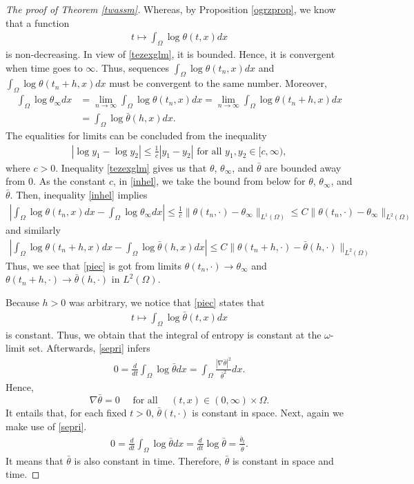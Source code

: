 \documentclass[11pt]{article}
\numberwithin{equation}{section}
\theoremstyle{plain}
\newcommand{\tn}{\Omega}
\newcommand{\io}{\int_{\Omega}}
\newcommand{\ld}{L^2(\Omega)}
\newcommand{\ddt}{\frac{d}{dt}}
\newcommand{\ot}{(0,\infty)\times\Omega}
\begin{document}
\begin{proof}[The proof of Theorem \ref{twassm}]
Whereas, by Proposition \ref{ogrzprop}, we know that a function
\begin{align*}
t\mapsto\io\log\theta(t,x)dx
\end{align*}
is non-decreasing. In view of \eqref{tezexglm}, it is bounded. Hence, it is convergent when time goes to $\infty$. Thus, sequences $\io\log\theta(t_n,x)dx$ and $\io\log\theta(t_n+h,x)dx$ must be convergent to the same number. Moreover,
\begin{align}\label{piec}
\nonumber\io\log\theta_{\infty} dx&=\lim_{n\to\infty}\io\log\theta(t_n,x)dx=\lim_{n\to\infty}\io\log\theta(t_n+h,x)dx\\
&=\io\log\bar\theta(h,x)dx.
\end{align}
The equalities for limits can be concluded from the inequality
\begin{align}\label{inhel}
|\log y_1-\log y_2|\leq\frac1c|y_1-y_2| \text{ for all }y_1,y_2\in[c,\infty),
\end{align}
where $c>0$. Inequality \eqref{tezexglm} gives us that $\theta$, $\theta_{\infty}$, and $\bar\theta$ are bounded away from $0$. As the constant $c$, in \eqref{inhel}, we take the bound from below for $\theta$, $\theta_{\infty}$, and $\bar\theta$.  Then, inequality \eqref{inhel} implies
\begin{align*}
\left|\io\log\theta(t_n,x)dx-\io\log\theta_{\infty} dx\right|\leq \frac1c\|\theta(t_n,\cdot)-\theta_{\infty}\|_{L^1(\tn)}\leq C\|\theta(t_n,\cdot)-\theta_{\infty}\|_{\ld}
\end{align*}
and similarly
\begin{align*}
\left|\io\log\theta(t_n+h,x)dx-\io\log\bar\theta(h,x) dx\right|\leq C\|\theta(t_n+h,\cdot)-\bar\theta(h,\cdot)\|_{\ld}
\end{align*}
Thus, we see that \eqref{piec} is got from limits $\theta(t_n,\cdot)\to\theta_{\infty}$ and $\theta(t_n+h,\cdot)\to\bar\theta(h,\cdot)$ in $\ld$.

Because $h>0$ was arbitrary, we notice that \eqref{piec} states that
\begin{align*}
t\mapsto\io\log\bar\theta(t,x)dx
\end{align*}
is constant. Thus, we obtain that the integral of entropy is constant at the $\omega$-limit set.  Afterwards, \eqref{sepri} infers
\begin{align*}
0=\ddt\io\log\bar\theta dx=\io\frac{|\nabla \bar\theta|^2}{\bar\theta^2}dx.
\end{align*}
Hence,
\[
\nabla \bar{\theta}=0 \quad\text{ for all }\quad(t,x)\in\ot.
\]
It entails that, for each fixed $t>0$, $\bar{\theta}(t,\cdot)$ is constant in space. Next, again we make use of \eqref{sepri}.
\begin{align*}
0=\ddt\io\log\bar\theta dx=\ddt\log\bar\theta =\frac{\bar\theta_t}{\bar\theta}.
\end{align*}
It means that $\bar\theta$ is also constant in time. Therefore, $\bar{\theta}$ is constant in space and time.


\end{proof}
\end{document}
